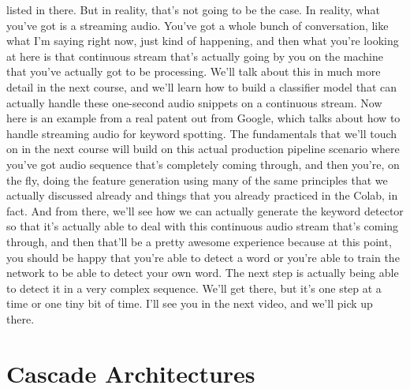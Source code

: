 listed in there.
But in reality, that's not going to be the case.
In reality, what you've got is a streaming audio.
You've got a whole bunch of conversation,
like what I'm saying right now, just kind of happening,
and then what you're looking at here is that continuous stream
that's actually going by you on the machine
that you've actually got to be processing.
We'll talk about this in much more detail in the next course,
and we'll learn how to build a classifier model that can actually
handle these one-second audio snippets on a continuous stream.
Now here is an example from a real patent out from Google,
which talks about how to handle streaming audio for keyword spotting.
The fundamentals that we'll touch on in the next course
will build on this actual production pipeline scenario
where you've got audio sequence that's completely coming through,
and then you're, on the fly, doing the feature generation using
many of the same principles that we actually discussed already
and things that you already practiced in the Colab, in fact.
And from there, we'll see how we can actually generate the keyword detector
so that it's actually able to deal with this continuous audio stream that's
coming through, and then that'll be a pretty awesome experience
because at this point, you should be happy that you're able to detect a word
or you're able to train the network to be able to detect your own word.
The next step is actually being able to detect it in a very complex sequence.
We'll get there, but it's one step at a time or one tiny bit of time.
I'll see you in the next video, and we'll pick up there.

\section{Cascade Architectures}

